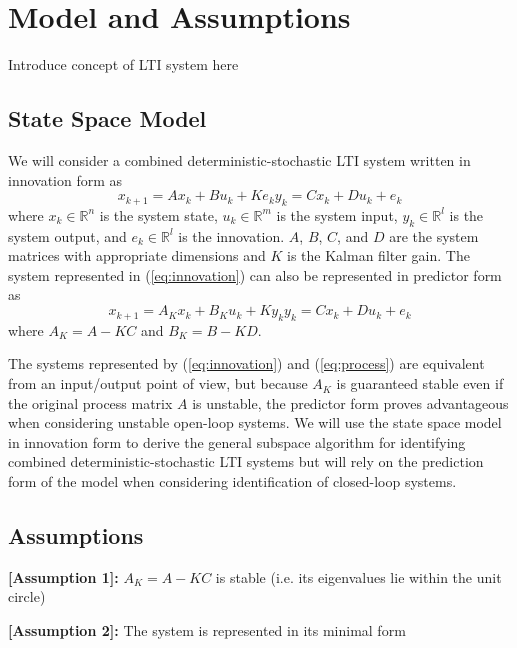 \chapter{Model and Assumptions}
Introduce concept of LTI system here
\section{State Space Model}
We will consider a combined deterministic-stochastic LTI system written in innovation form as
\begin{subequations}\label{eq:innovation}
\begin{equation}x_{k+1} = Ax_k + Bu_k + Ke_k\end{equation}
\begin{equation}y_k = Cx_k + Du_k + e_k\end{equation}
\end{subequations}
where $x_k \in \mathbb{R}^n$ is the system state, $u_k \in \mathbb{R}^m$ is the system input, $y_k \in \mathbb{R}^l$ is the system output, and $e_k \in \mathbb{R}^l$ is the innovation. $A$, $B$, $C$, and $D$ are the system matrices with appropriate dimensions and $K$ is the Kalman filter gain. The system represented in (\ref{eq:innovation}) can also be represented in predictor form as
\begin{subequations}\label{eq:process}
\begin{equation}x_{k+1} = A_Kx_k + B_Ku_k + Ky_k\end{equation}
\begin{equation}y_k = Cx_k + Du_k + e_k\end{equation}
\end{subequations}
where $A_K = A-KC$ and $B_K = B-KD$.

The systems represented by (\ref{eq:innovation}) and (\ref{eq:process}) are equivalent from an input/output point of view, but because $A_K$ is guaranteed stable even if the original process matrix $A$ is unstable, the predictor form proves advantageous when considering unstable open-loop systems. We will use the state space model in innovation form to derive the general subspace algorithm for identifying combined deterministic-stochastic LTI systems but will rely on the prediction form of the model when considering identification of closed-loop systems.

\section{Assumptions}

\textbf{[Assumption 1]:} $A_K = A - KC$ is stable (i.e. its eigenvalues lie within the unit circle)

\noindent \textbf{[Assumption 2]:} The system is represented in its minimal form
